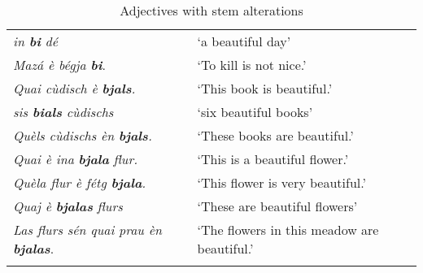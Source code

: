 \begin{table}\
\caption{Adjectives with stem alterations}
\label{tab:adj:stemalterations}
 \begin{tabular}{ll}
  \lsptoprule
    \textit{in \textbf{bi} dé} & `a beautiful day'\\
\textit{Mazá è bégja \textbf{bi}}. &`To kill is not nice.'\\
\textit{Quai cùdisch è} \textbf{\textit{bjals}}\textit{.} & `This book is beautiful.'\\
\textit{sis \textbf{bials} cùdischs} & `six beautiful books'\\
\textit{Quèls cùdischs èn} \textbf{\textit{bjals}}\textit{.} & `These books are beautiful.'\\
\textit{Quai è ina} \textbf{\textit{bjala}} \textit{flur.} & `This is a beautiful flower.'\\
\textit{Quèla flur è fétg \textbf{bjala}. }&`This flower is very beautiful.'\\
\textit{Quaj è} \textbf{\textit{bjalas}} \textit{flurs} & `These are beautiful flowers'\\
\textit{Las flurs sén quai prau èn \textbf{bjalas}}. &`The flowers in this meadow are beautiful.'\\
  \lspbottomrule
 \end{tabular}
\end{table}


